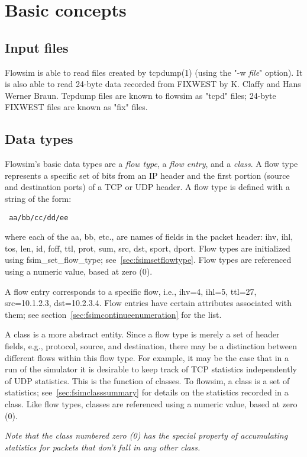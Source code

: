 \documentclass{article}
\begin{document}
\section{Basic concepts}
\subsection{Input files}
Flowsim is able to read files created by tcpdump(1) (using the "-w
\emph{file}" option).  It is also able to read 24-byte data recorded
from FIXWEST by K. Claffy and Hans Werner Braun.  Tcpdump files are
known to flowsim as "tcpd" files; 24-byte FIXWEST files are known as
"fix" files.

\subsection{Data types}
Flowsim's basic data types are a \emph{flow type}, a \emph{flow entry},
and a \emph{class}.  A flow type represents a specific set of bits from
an IP header and the first portion (source and destination ports) of a
TCP or UDP header.  A flow type is defined with a string of the form:
\begin{verbatim} aa/bb/cc/dd/ee \end{verbatim}
where each of the aa, bb, etc., are names of fields in the packet
header: ihv, ihl, tos, len, id, foff, ttl, prot, sum, src, dst, sport,
dport.  Flow types are initialized using fsim\_set\_flow\_type;
see~\ref{sec:fsimsetflowtype}.  Flow types are referenced using a
numeric value, based at zero (0).

A flow entry corresponds to a specific flow, i.e., ihv=4, ihl=5,
ttl=27, src=10.1.2.3, dst=10.2.3.4.  Flow entries have certain
attributes associated with them; see
section~\ref{sec:fsimcontinueenumeration} for the list.

A class is a more abstract entity.  Since a flow type is merely a set
of header fields, e.g., protocol, source, and destination, there may be a
distinction between different flows within this flow type.  For
example, it may be the case that in a run of the simulator it is
desirable to keep track of TCP statistics independently of UDP
statistics.  This is the function of classes.  To flowsim, a class is a
set of statistics; see~\ref{sec:fsimclasssummary} for details on the
statistics recorded in a class.  Like flow types, classes are
referenced using a numeric value, based at zero (0).

\emph{Note that the class numbered zero (0) has the special property of
accumulating statistics for packets that don't fall in any other
class.}
\end{document}
